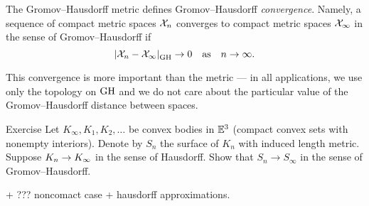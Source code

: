 The Gromov--Hausdorff metric defines Gromov--Hausdorff \emph{convergence}.
Namely, a sequence of compact metric spaces $\mathcal{X}_n$ converges to compact metric spaces $\mathcal{X}_\infty$ in the sense of Gromov--Hausdorff if 
\[\dist{\spc{X}_n}{\spc{X}_\infty}{\GH}\to 0\quad\text{as}\quad n\to\infty.\]

This convergence is more important than the metric ---
in all applications, we use only the topology on $\operatorname{\rm GH}\nolimits$
and we do not care about the particular value of the Gromov--Hausdorff distance between spaces.

\begin{thm}{Exercise}\label{ex:surface-covergence}
Let $K_\infty,K_1,K_2,\dots$ be convex bodies in $\mathbb{E}^3$ (compact convex sets with nonempty interiors).
Denote by $S_n$ the surface of $K_n$ with induced length metric.
Suppose $K_n\z\to K_\infty$ in the sense of Hausdorff.
Show that $S_n\to S_\infty$ in the sense of Gromov--Hausdorff.
\end{thm}

+ ??? noncomact case + hausdorff approximations.

